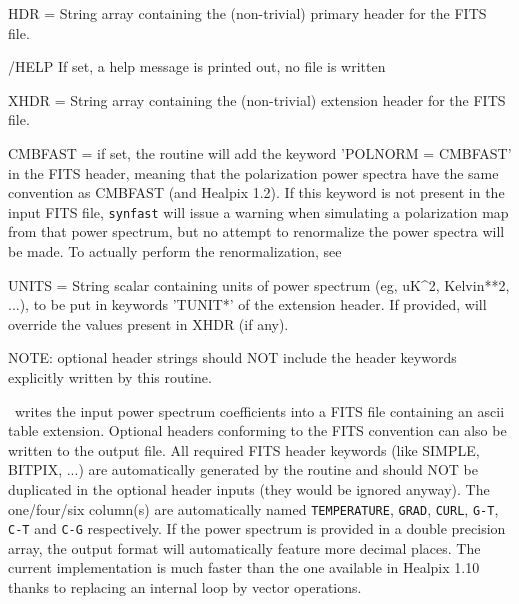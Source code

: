\begin{keywords}
  \begin{kwlist}{} %
    \item[HDR =] String array containing the (non-trivial) primary header
      for the FITS file. 
    \item[/HELP] If set, a help message is printed out, no file is written

    \item[XHDR =] String array containing the (non-trivial) extension header
      for the FITS file. 
    \item[CMBFAST =] if set, the routine will add the keyword 'POLNORM =
    CMBFAST' in the FITS header, meaning that the polarization power spectra
    have the same convention as CMBFAST (and Healpix 1.2). 
    If this keyword is not present in the input FITS file, {\tt synfast} will issue a
    warning when simulating a polarization map from that power spectrum, but no
    attempt to renormalize the power spectra will be made. To actually perform
    the renormalization, see 
    \item[UNITS =] String scalar containing units of power spectrum (eg, uK{\^{}}2,
         Kelvin**2, ...), to be put in keywords 'TUNIT*' of the extension header. 
         If provided, will override the values present in XHDR (if any).
    \item[ ] NOTE: optional header strings should NOT include the
      header keywords explicitly written by this routine.

  \end{kwlist}
\end{keywords}  

\begin{codedescription}
{\thedocid\ writes the input power spectrum coefficients into a FITS
file containing an ascii table extension. Optional headers conforming
to the FITS convention can also be written to the output file. All
required FITS header keywords (like SIMPLE, BITPIX, ...) are automatically generated by the
routine and should NOT be duplicated in the optional header inputs
(they would be ignored anyway).
The one/four/six column(s) are automatically named 
{\tt TEMPERATURE}, {\tt GRAD}, {\tt CURL}, {\tt G-T}, {\tt C-T} and {\tt C-G}
respectively.
If the power spectrum is provided in a double precision array, the output format
will automatically feature more decimal places.
The current implementation is much faster than the one available in
Healpix 1.10 thanks to replacing an internal loop by vector operations.}
\end{codedescription}



